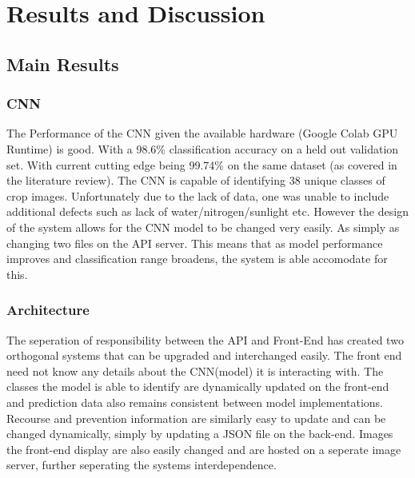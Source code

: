 \chapter{Results and Discussion}
\label{results_discussion}
\section{Main Results}
  \subsection{CNN}
    The Performance of the CNN given the available hardware (Google Colab GPU Runtime) is good. With a 98.6\% classification accuracy on a held out validation set. With current cutting edge being 99.74\% on the same dataset (as covered in the literature review). The CNN is capable of identifying 38 unique classes of crop images. Unfortunately due to the lack of data, one was unable to include additional defects such as lack of water/nitrogen/sunlight etc. However the design of the system allows for the CNN model to be changed very easily. As simply as changing two files on the API server. This means that as model performance improves and classification range broadens, the system is able accomodate for this.

  \subsection{Architecture}
    The seperation of responsibility between the API and Front-End has created two orthogonal systems that can be upgraded and interchanged easily. The front end need not know any details about the CNN(model) it is interacting with. The classes the model is able to identify are dynamically updated on the front-end and prediction data also remains consistent between model implementations. Recourse and prevention information are similarly easy to update and can be changed dynamically, simply by updating a JSON file on the back-end. Images the front-end display are also easily changed and are hosted on a seperate image server, further seperating the systems interdependence.

